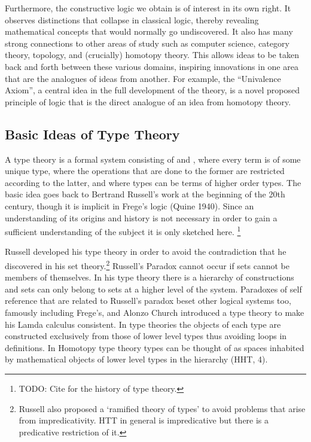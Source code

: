 Furthermore, the constructive logic we obtain is of interest in its own right. It observes distinctions that collapse in classical logic, thereby revealing mathematical concepts that would normally go undiscovered.  It also has many strong connections to other areas of study such as computer science, category theory, topology, and (crucially) homotopy theory.  This allows ideas to be taken back and forth between these various domains, inspiring innovations in one area that are the analogues of ideas from another. For example, the ``Univalence Axiom'', a central idea in the full development of the theory, is a novel proposed principle of logic that is the direct analogue of an idea from homotopy theory.

\newpage
\subsection{Basic Ideas of Type Theory}
\label{sec:TypeTheory-BasicIdeas}

A type theory is a formal system consisting of  and , where every term is of some unique type, where the operations that are done to the former are restricted according to the latter, and where types can be terms of higher order types. The basic idea goes back to Bertrand Russell's work at the beginning of the 20th century, though it is implicit in Frege's logic (Quine 1940). Since an understanding of its origins and history is not necessary in order to gain a sufficient understanding of the subject it is only sketched here. \footnote{
TODO: Cite for the history of type theory.
}  

Russell developed his type theory in order to avoid the contradiction that he discovered in his set theory.\footnote{Russell also proposed a `ramified theory of types' to avoid problems that arise from impredicativity. HTT in general is impredicative but there is a predicative restriction of it.} Russell's Paradox cannot occur if sets cannot be members of themselves. In his type theory there is a hierarchy of constructions and sets can only belong to sets at a higher level of the system. Paradoxes of self reference that are related to Russell's paradox beset other logical systems too, famously including Frege's, and Alonzo Church introduced a type theory to make his Lamda calculus consistent. In type theories the objects of each type are constructed exclusively from those of lower level types thus avoiding loops in definitions. In Homotopy type theory types can be thought of as spaces inhabited by mathematical objects of lower level types in the hierarchy (HHT, 4).


